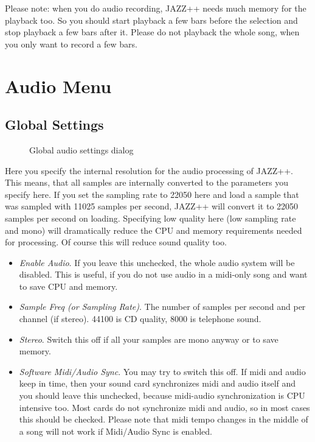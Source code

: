 \documentclass[letterpaper]{report}
\begin{document}
Please note: when you do audio recording, JAZZ++ needs much memory for the
playback too. So you should start playback a few bars before the
selection and stop playback a few bars after it. Please do not playback
the whole song, when you only want to record a few bars.


\section{Audio Menu}

\subsection{Global Settings}\label{globalsettings}

\begin{figure}%
%
%
\caption{Global audio settings dialog}%
\end{figure}

Here you specify the internal resolution for the audio processing of
JAZZ++.  This means, that all samples are internally converted to the
parameters you specify here. If you set the sampling rate to 22050 here
and load a sample that was sampled with 11025 samples per second, JAZZ++
will convert it to 22050 samples per second on loading. Specifying
low quality here (low sampling rate and mono) will dramatically reduce
the CPU and memory requirements needed for processing. Of course this
will reduce sound quality too.

\begin{itemize}

\item {\em Enable Audio}. If you leave this unchecked, the whole audio system
will be disabled. This is useful, if you do not use audio in a midi-only
song and want to save CPU and memory.

\item {\em Sample Freq (or Sampling Rate)}. The number of samples per second and
per channel (if stereo). 44100 is CD quality, 8000 is telephone sound.

\item {\em Stereo}. Switch this off if all your samples are mono anyway or to
save memory.

\item {\em Software Midi/Audio Sync}. You may try to switch this off. If midi
and audio keep in time, then your sound card synchronizes midi and audio
itself and you should leave this unchecked, because midi-audio synchronization
is CPU intensive too. Most cards do not synchronize midi and audio, so
in most cases this should be checked. Please note that midi tempo changes
in the middle of a song will not work if Midi/Audio Sync is enabled.

\end{itemize}
\end{document}
